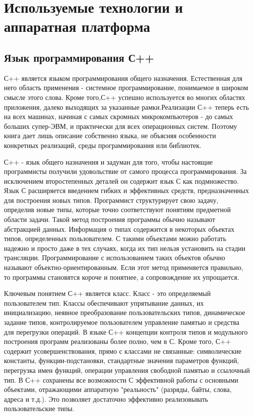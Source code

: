 \section{Используемые технологии и аппаратная платформа}


\subsection{Язык программирования С++}

С++ является языком программирования общего назначения. Естественная для него область
применения - системное программирование, понимаемое в широком смысле этого слова. Кроме того,С++ успешно используется во многих областях приложения, далеко выходящих за указанные рамки.Реализации С++ теперь есть на всех машинах, начиная с самых скромных микрокомпьютеров - до самых больших супер-ЭВМ, и практически для всех операционных систем. Поэтому книга дает лишь описание собственно языка, не объясняя особенности конкретных реализаций, среды программирования или библиотек.

С++ - язык общего назначения и задуман для того, чтобы настоящие программисты получили
удовольствие от самого процесса программирования. За исключением второстепенных деталей он содержит язык С как подмножество. Язык С расширяется введением гибких и эффективных средств, предназначенных для построения новых типов. Программист структурирует свою задачу, определив новые типы, которые точно соответствуют понятиям предметной области задачи. Такой метод построения программы обычно называют абстракцией данных. Информация о типах содержится в некоторых объектах типов, определенных пользователем. С такими объектами можно работать надежно и просто даже в тех случаях, когда их тип нельзя установить на стадии трансляции. Программирование с использованием таких объектов обычно называют объектно-ориентированным. Если этот метод применяется правильно, то программы становятся короче и понятнее, а сопровождение их упрощается.

Ключевым понятием С++ является класс. Класс - это определяемый пользователем тип. Классы обеспечивают упрятывание данных, их инициализацию, неявное преобразование пользовательских типов, динамическое задание типов, контролируемое пользователем управление памятью и средства для перегрузки операций. В языке С++ концепции контроля типов и модульного построения программ реализованы более полно, чем в С. Кроме того, С++ содержит усовершенствования, прямо с классами не связанные: символические константы, функции-подстановки, стандартные значения параметров
функций, перегрузка имен функций, операции управления свободной памятью и ссылочный тип. В С++ сохранены все возможности С эффективной работы с основными объектами, отражающими аппаратную "реальность" (разряды, байты, слова, адреса и т.д.). Это позволяет достаточно эффективно реализовывать пользовательские типы.

